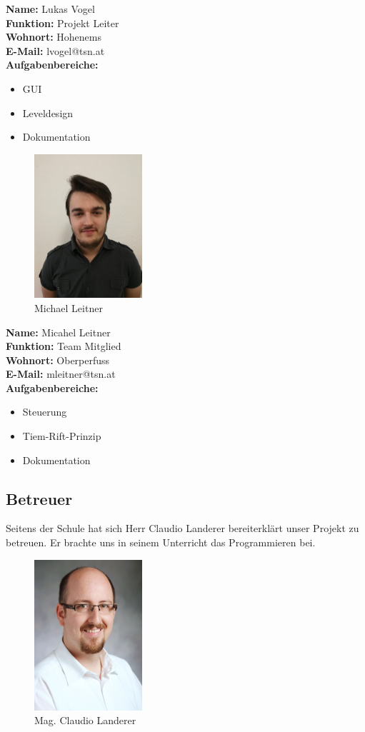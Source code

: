 	\textbf{Name:} Lukas Vogel\\
\textbf{Funktion:} Projekt Leiter\\
\textbf{Wohnort:} Hohenems\\
\textbf{E-Mail:} lvogel@tsn.at\\
\textbf{Aufgabenbereiche:} \begin{itemize}
	\item GUI
	\item Leveldesign
	\item Dokumentation
\end{itemize}
\begin{figure}[H]
	\centering
	\includegraphics[width=4cm]{images/Leitner.jpeg}
	\caption{Michael Leitner}
\end{figure}
	\textbf{Name:} Micahel Leitner\\
\textbf{Funktion:} Team Mitglied\\
\textbf{Wohnort:} Oberperfuss\\
\textbf{E-Mail:} mleitner@tsn.at\\
\textbf{Aufgabenbereiche:} \begin{itemize}
	\item Steuerung
	\item Tiem-Rift-Prinzip
	\item Dokumentation
\end{itemize}
\newpage
\subsection{Betreuer}
Seitens der Schule hat sich Herr Claudio Landerer bereiterklärt unser Projekt zu betreuen. Er brachte uns in seinem Unterricht das Programmieren bei.
	\begin{figure}[H]
		\centering
		\includegraphics[width=4cm]{images/Landerer_Claudio.jpg}
		\caption{Mag. Claudio Landerer}
	\end{figure}
		
